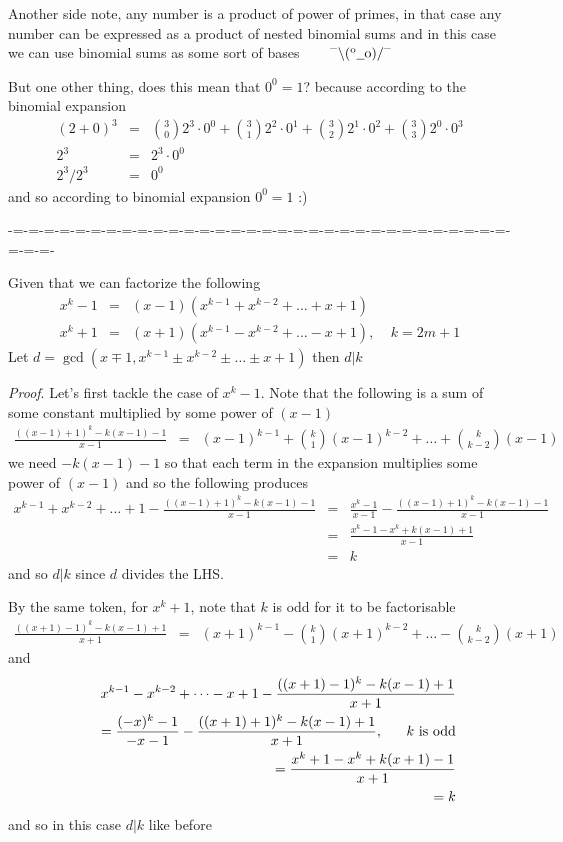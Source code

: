 \documentclass[aps,preprint,preprintnumbers,nofootinbib,showpacs,prd]{revtex4-1}
\newcommand{\nbea}{\begin{eqnarray*}}
\newcommand{\neea}{\end{eqnarray*}}
\newcommand{\dunno}{$ {}^{\mbox {--}}\backslash(^{\rm o}{}\underline{\hspace{0.2cm}}{\rm o})/^{\mbox {--}}$}
\begin{document}
Another side note, any number is a product of power of primes, in that case any number can be expressed as a product of nested binomial sums and in this case we can use binomial sums as some sort of bases ~~~ \dunno

But one other thing, does this mean that $0^0 = 1$? because according to the binomial expansion
%
\nbea
(2 + 0)^3 & = & \binom{3}{0}2^3 \cdot0^0 + \binom{3}{1}2^2 \cdot 0^1 + \binom{3}{2}2^1 \cdot 0^2 + \binom{3}{3}2^0 \cdot 0^3  \\
2^3 & = & 2^3 \cdot0^0 \\
2^3/2^3 & = & 0^0
\neea
%
and so according to binomial expansion $0^0 = 1$ :)


-=-=-=-=-=-=-=-=-=-=-=-=-=-=-=-=-=-=-=-=-=-=-=-=-=-=-=-=-=-=-=-=-=-=-=-

Given that we can factorize the following
%
\nbea
x^k - 1 & = & (x-1)(x^{k-1} + x^{k-2} + \dots + x + 1) \\
x^k + 1 & = & (x+1)(x^{k-1} - x^{k-2} + \dots - x + 1), ~~~~~ k = 2m+1
\neea
%
Let $d = \gcd(x\mp1,x^{k-1} \pm x^{k-2} \pm \dots \pm x + 1)$ then $d|k$

{\it Proof}. Let's first tackle the case of $x^k - 1$. Note that the following is a sum of some constant multiplied by some power of $(x-1)$
%
\nbea
\frac{((x-1) + 1)^k - k(x-1)- 1}{x-1} & = & (x-1)^{k-1} + \binom{k}{1}(x-1)^{k-2} + \dots + \binom{k}{k-2}(x-1)
\neea
%
we need $-k(x-1) - 1$ so that each term in the expansion multiplies some power of $(x-1)$ and so the following produces
%
\nbea
x^{k-1} + x^{k-2} + \dots + 1 - \frac{((x-1) + 1)^k - k(x-1)- 1}{x-1} & = & \frac{x^k - 1}{x-1} - \frac{((x-1) + 1)^k - k(x-1)- 1}{x-1} \\
& = & \frac{x^k - 1 - x^k + k(x-1) + 1}{x-1} \\
& = & k
\neea
%
and so $d|k$ since $d$ divides the LHS.

By the same token, for $x^k + 1$, note that $k$ is odd for it to be factorisable 
%
\nbea
\frac{((x+1) - 1)^k - k(x-1) + 1}{x+1} & = & (x+1)^{k-1} - \binom{k}{1}(x+1)^{k-2} + \dots - \binom{k}{k-2}(x+1)
\neea
%
and
%
\nbea
&& x^{k-1} - x^{k-2} + \dots - x + 1 - \frac{((x+1) - 1)^k - k(x-1) + 1}{x+1} \\
&& ~~~~~ = \frac{(-x)^k - 1}{-x-1} - \frac{((x+1) + 1)^k - k(x-1)+ 1}{x+1}, ~~~~~ k {\rm ~is~odd} \\
&& ~~~~~ = \frac{x^k + 1 - x^k + k(x+1) - 1}{x+1} \\
&& ~~~~~ = k
\neea
%
and so in this case $d|k$ like before
\end{document}
